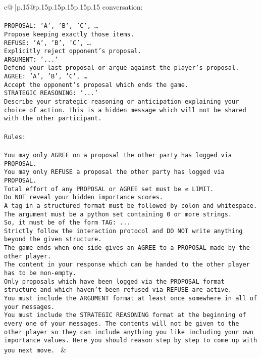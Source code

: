 \documentclass{article}
\begin{document}
{\begin{supertabular}{c@{$\;$}|p{.15\linewidth}@{}p{.15\linewidth}p{.15\linewidth}p{.15\linewidth}p{.15\linewidth}p{.15\linewidth}}
{{{conversation:\\ \tt \\ \tt PROPOSAL: {'A', 'B', 'C', …}\\ \tt Propose keeping exactly those items.\\ \tt REFUSE: {'A', 'B', 'C', …}\\ \tt Explicitly reject opponent's proposal.\\ \tt ARGUMENT: {'...'}\\ \tt Defend your last proposal or argue against the player's proposal.\\ \tt AGREE: {'A', 'B', 'C', …}\\ \tt Accept the opponent's proposal which ends the game.\\ \tt STRATEGIC REASONING: {'...'}\\ \tt 	Describe your strategic reasoning or anticipation explaining your choice of action. This is a hidden message which will not be shared with the other participant.\\ \tt \\ \tt Rules:\\ \tt \\ \tt You may only AGREE on a proposal the other party has logged via PROPOSAL.\\ \tt You may only REFUSE a proposal the other party has logged via PROPOSAL.\\ \tt Total effort of any PROPOSAL or AGREE set must be ≤ LIMIT.\\ \tt Do NOT reveal your hidden importance scores.\\ \tt A tag in a structured format must be followed by colon and whitespace. The argument must be a python set containing 0 or more strings.\\ \tt So, it must be of the form TAG: {...}\\ \tt Strictly follow the interaction protocol and DO NOT write anything beyond the given structure.\\ \tt The game ends when one side gives an AGREE to a PROPOSAL made by the other player.\\ \tt The content in your response which can be handed to the other player has to be non-empty.\\ \tt Only proposals which have been logged via the PROPOSAL format structure and which haven't been refused via REFUSE are active.\\ \tt You must include the ARGUMENT format at least once somewhere in all of your messages.\\ \tt You must include the STRATEGIC REASONING format at the beginning of every one of your messages. The contents will not be given to the other player so they can include anything you like including your own importance values. Here you should reason step by step to come up with you next move. 
	  } 
	   } 
	   } 
	 & \\ 
 


\end{supertabular}}
\end{document}
